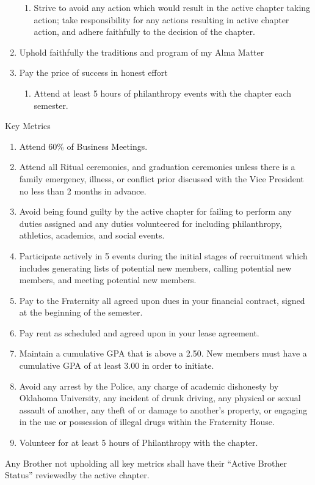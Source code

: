 \documentclass{article}
\begin{document}
\begin{enumerate}
\begin{enumerate}
        \item Strive to avoid any action which would result in the active chapter taking action; take responsibility for any actions resulting in active chapter action, and adhere faithfully to the decision of the chapter.
    \end{enumerate}
    \item Uphold faithfully the traditions and program of my Alma Matter
    \item Pay the price of success in honest effort
    \begin{enumerate}
        \item Attend at least 5 hours of philanthropy events with the chapter each semester.
    \end{enumerate}
\end{enumerate}

Key Metrics

\begin{enumerate}
    \item Attend 60\% of Business Meetings.
    \item Attend all Ritual ceremonies, and graduation ceremonies unless there is a family emergency, illness, or conflict prior discussed with the Vice President no less than 2 months in advance.
    \item Avoid being found guilty by the active chapter for failing to perform any duties assigned and any duties volunteered for including philanthropy, athletics, academics, and social events.
    \item Participate actively in 5 events during the initial stages of recruitment which includes generating lists of potential new members, calling potential new members, and meeting potential new members.
    \item Pay to the Fraternity all agreed upon dues in your financial contract, signed at the beginning of the semester.
    \item Pay rent as scheduled and agreed upon in your lease agreement.
    \item Maintain a cumulative GPA that is above a 2.50. New members must have a cumulative GPA of at least 3.00 in order to initiate.
    \item Avoid any arrest by the Police, any charge of academic dishonesty by Oklahoma University, any incident of drunk driving, any physical or sexual assault of another, any theft of or damage to another’s property, or engaging in the use or possession of illegal drugs within the Fraternity House.
    \item Volunteer for at least 5 hours of Philanthropy with the chapter.
\end{enumerate}

Any Brother not upholding all key metrics shall have their “Active Brother Status” reviewed\footnotemark by the active chapter.

\end{document}
